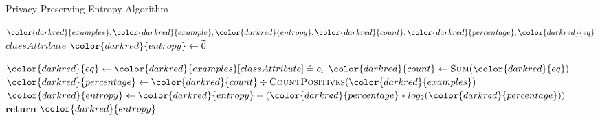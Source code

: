 \begin{algorithm}[H]
\caption{Privacy Preserving Entropy Algorithm}\label{a:id3-entropy-pp}
\begin{algorithmic}[1]
\Require ${\color{darkred}{examples}}, {\color{darkred}{example}}, {\color{darkred}{entropy}}, {\color{darkred}{count}}, {\color{darkred}{percentage}}, {\color{darkred}{eq}}$
\renewcommand{\algorithmicrequire}{\textbf{Global Vars:}}
\Require $classAttribute$
    \State ${\color{darkred}{entropy}} \gets \enc{0}$

        \State ${\color{darkred}{eq}} \gets {\color{darkred}{examples}}[classAttribute] \heq c_i$ 
        \State ${\color{darkred}{count}} \gets \textsc{Sum}({\color{darkred}{eq}})$
        \State ${\color{darkred}{percentage}} \gets {\color{darkred}{count}} \div \textsc{CountPositives}({\color{darkred}{examples}})$
        \State ${\color{darkred}{entropy}} \gets {\color{darkred}{entropy}} - ({\color{darkred}{percentage}} * log_2 ({\color{darkred}{percentage}}))$
    \EndFor
    \State \textbf{return} ${\color{darkred}{entropy}}$
\EndProcedure
\end{algorithmic}
\end{algorithm}
